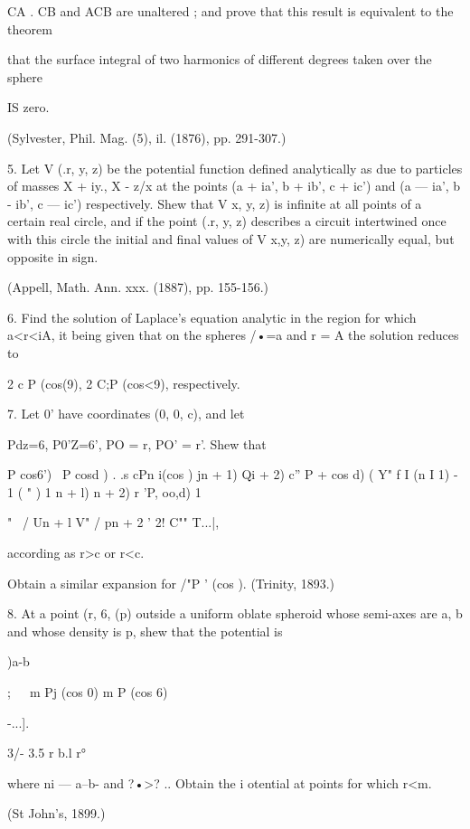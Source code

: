 CA . CB and ACB are unaltered ; and prove that this result is
equivalent to the theorem

that the surface integral of two harmonics of different degrees taken
over the sphere

IS zero.

(Sylvester, Phil. Mag. (5), il. (1876), pp. 291-307.)

5. Let V (.r, y, z) be the potential function defined analytically as
due to particles of masses X + iy., X - z/x at the points (a + ia', b
+ ib', c + ic') and (a — ia', b - ib', c — ic') respectively. Shew
that V x, y, z) is infinite at all points of a certain real circle,
and if the point (.r, y, z) describes a circuit intertwined once with
this circle the initial and final values of V x,y, z) are numerically
equal, but opposite in sign.

(Appell, Math. Ann. xxx. (1887), pp. 155-156.)

6. Find the solution of Laplace's equation analytic in the region for
which a<r<iA, it being given that on the spheres /•=a and r = A the
solution reduces to

2 c P (cos(9), 2 C;P (cos<9), respectively.

7. Let 0' have coordinates (0, 0, c), and let

Pdz=6, P0'Z=6', PO = r, PO' = r'. Shew that

P cos6') \ P cosd ) . .s cPn i(cos ) jn + 1) Qi + 2) c'' P + cos d) (
Y" f I (n I 1) - 1 ( " ) 1 n + l) n + 2) r 'P, oo,d) 1

"~ / Un + l V" / pn + 2 ' 2! C"" T...|,

according as r>c or r<c.

Obtain a similar expansion for /"P ' (cos ). (Trinity, 1893.)

8. At a point (r, 6, (p) outside a uniform oblate spheroid whose
semi-axes are a, b and whose density is p, shew that the potential is



)a-b



;\ \ \ m Pj (cos 0) m P (cos 6)



-...].



3/- 3.5 r b.l r°

where ni — a--b- and ?•>? .. Obtain the i otential at points for which
r<m.

(St John's, 1899.)



